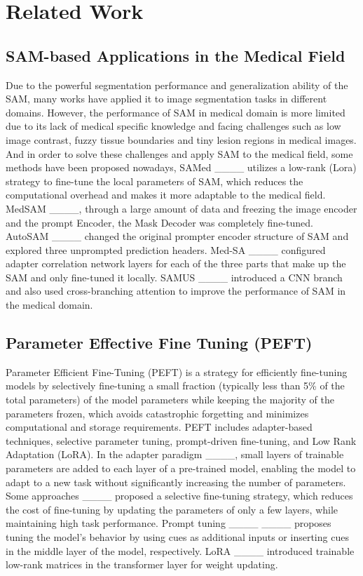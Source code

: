 \section{Related Work}
\subsection{SAM-based Applications in the Medical Field}
Due to the powerful segmentation performance and generalization ability of the SAM, many works have applied it to image segmentation tasks in different domains. However, the performance of SAM in medical domain is more limited due to its lack of medical specific knowledge and facing challenges such as low image contrast, fuzzy tissue boundaries and tiny lesion regions in medical images. And in order to solve these challenges and apply SAM to the medical field, some methods have been proposed nowadays, SAMed ____ utilizes a low-rank (Lora) strategy to fine-tune the local parameters of SAM, which reduces the computational overhead and makes it more adaptable to the medical field. MedSAM ____, through a large amount of data and freezing the image encoder and the prompt Encoder, the Mask Decoder was completely fine-tuned. AutoSAM ____ changed the original prompter encoder structure of SAM and explored three unprompted prediction headers. Med-SA ____ configured adapter correlation network layers for each of the three parts that make up the SAM and only fine-tuned it locally. SAMUS ____ introduced a CNN branch and also used cross-branching attention to improve the performance of SAM in the medical domain.

\subsection{Parameter Effective Fine Tuning (PEFT) }
Parameter Efficient Fine-Tuning (PEFT) is a strategy for efficiently fine-tuning models by selectively fine-tuning a small fraction (typically less than 5\% of the total parameters) of the model parameters while keeping the majority of the parameters frozen, which avoids catastrophic forgetting and minimizes computational and storage requirements. PEFT includes adapter-based techniques, selective parameter tuning, prompt-driven fine-tuning, and Low Rank Adaptation (LoRA). In the adapter paradigm ____, small layers of trainable parameters are added to each layer of a pre-trained model, enabling the model to adapt to a new task without significantly increasing the number of parameters. Some approaches ____ proposed a selective fine-tuning strategy, which reduces the cost of fine-tuning by updating the parameters of only a few layers, while maintaining high task performance. Prompt tuning ____ ____ proposes tuning the model's behavior by using cues as additional inputs or inserting cues in the middle layer of the model, respectively. LoRA ____ introduced trainable low-rank matrices in the transformer layer for weight updating.

